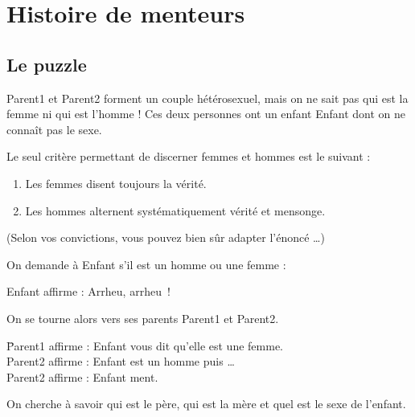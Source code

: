 
\chapter{Histoire de menteurs}



\setlength{\parskip}{2ex}
\setlength{\parindent}{0pt}

\section{Le puzzle}
\label{sec:mensonge}

Parent1 et Parent2 forment un couple hétérosexuel, mais on ne sait pas qui est la femme ni
qui est l'homme ! Ces deux personnes ont un enfant Enfant dont on ne connaît pas le
sexe.

Le seul critère permettant de discerner femmes et hommes est le suivant :

\begin{enumerate}
\item Les femmes disent toujours la vérité.
\item Les hommes alternent systématiquement vérité et mensonge.
\end{enumerate}

(Selon vos convictions, vous pouvez bien sûr adapter l'énoncé \ldots)

On demande à Enfant s'il est un homme ou une femme :

\begin{tabbing}
  \hspace{2.5em} Enfant affirme : Arrheu, arrheu~!
\end{tabbing}
On se tourne alors vers ses parents Parent1 et Parent2.
\begin{tabbing}
  \hspace{2.5em}\= Parent1 affirme : Enfant vous dit qu'elle est une femme.\\
                \> Parent2 affirme : Enfant est un homme puis \dots\\
                \> Parent2 affirme : Enfant ment.
\end{tabbing}

On cherche à savoir qui est le père, qui est la mère et quel est le sexe de l'enfant.


